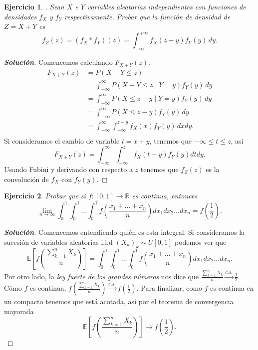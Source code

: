 \documentclass[11pt]{article}
\theoremstyle{ejstyle}
\newtheorem{ejercicio}{Ejercicio}
\newenvironment{solucion}
{\begin{proof}[{\bfseries\color{deepindigo} Solución}]}
	{\end{proof}}
\begin{document}
	\begin{ejercicio}.
		Sean $X$ e $Y$ variables aleatorias independientes con funciones de densidades $f_X$ y $f_Y$ respectivamente. Probar que la función de densidad de $Z = X + Y$ es
		$$
		f_Z(z) = (f_X * f_Y)(z) = \int_{-\infty}^{+\infty} f_X(z - y)f_Y(y) \, dy.
		$$
	\end{ejercicio}
	
	\begin{solucion}
		Comencemos calculando $F_{X+Y}(z)$.
	\begin{align*}
		F_{X+Y}(z) &= P(X + Y \leq z) \\
		&= \int_{-\infty}^{\infty} P(X + Y \leq z \mid Y = y) f_Y(y) \, dy \\
		&= \int_{-\infty}^{\infty} P(X \leq z - y \mid Y = y) f_Y(y) \, dy \\
		&= \int_{-\infty}^{\infty} P(X \leq z - y) f_Y(y) \, dy \\
		&= \int_{-\infty}^{\infty} \int_{-\infty}^{z - y} f_X(x) f_Y(y) \, dxdy.\\
	\end{align*}
	Si consideramos el cambio de variable $t = x + y$, tenemos que $-\infty \leq t \leq z$, así
	$$
	F_{X+Y}(z) = \int_{-\infty}^{\infty} \int_{-\infty}^{z} f_X(t - y)f_Y(y) dtdy.
	$$
	Usando Fubini y derivando con respecto a $z$ tenemos que $f_{Z}(z)$ es la convolución de $f_{X}$ con $f_{Y}(y)$.
	\end{solucion}
		
	\begin{ejercicio}
		Probar que si $f: [0, 1] \to \mathbb{R}$ es continua, entonces
		$$
		\lim_{n \to \infty} \int_{0}^{1} \int_{0}^{1} \dots \int_{0}^{1} f\left( \frac{x_1 + \dots + x_n}{n} \right) dx_1 dx_2 \dots dx_n = f\left(\frac{1}{2}\right).
		$$
	\end{ejercicio}
	
	\begin{solucion}
		Comencemos entendiendo quién es esta integral. Si consideramos la sucesión de variables aleatorias i.i.d $(X_k)_k \sim U[0, 1]$ podemos ver que
		$$\mathbb{E}[f(\frac{\sum_{k=1}^{n} X_k}{n})] = \int_{0}^{1} \int_{0}^{1} \dots \int_{0}^{1} f\left( \frac{x_1 + \dots + x_n}{n} \right) dx_1 dx_2 \dots dx_n.$$
		\noindent Por otro lado, la \emph{ley fuerte de los grandes números} nos dice que $\frac{\sum_{k=1}^{n} X_k}{n} \xrightarrow{c.s.} \frac{1}{2}$. Cómo $f$ es continua, $f(\frac{\sum_{k=1}^{n} X_k}{n}) \xrightarrow{c.s.} f(\frac{1}{2})$. Para finalizar, como $f$ es continua en un compacto tenemos que está acotada, así por el teorema de convergencia mayorada 
		$$ 
		\mathbb{E}[f(\frac{\sum_{k=1}^{n} X_k}{n})] \longrightarrow f(\frac{1}{2}).
		$$
	\end{solucion}
	
\end{document}

